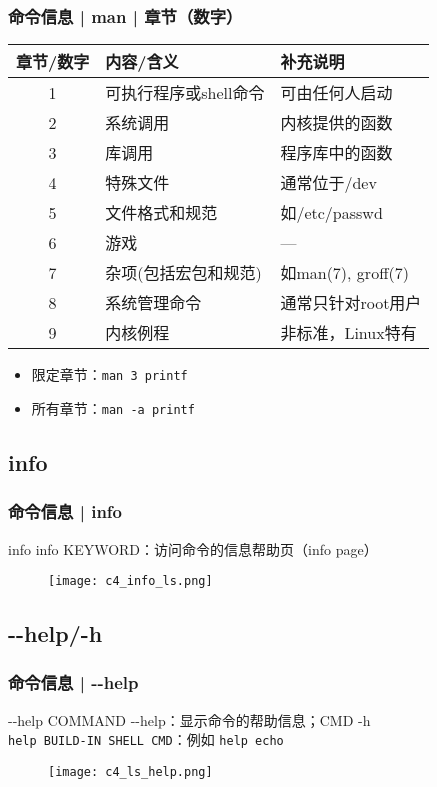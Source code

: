 \begin{frame}[fragile]
  \frametitle{命令信息 | man | 章节（数字）}
  \begin{table}
    \centering
    \begin{tabular}{cll}
      \hline
      \rowcolor{blue!50}章节/数字 & 内容/含义 & 补充说明\\
      \hline
      1 & 可执行程序或shell命令 & 可由任何人启动 \\
      2 & 系统调用 & 内核提供的函数\\
      3 & 库调用 & 程序库中的函数\\
      4 & 特殊文件 & 通常位于/dev\\
      5 & 文件格式和规范 & 如/etc/passwd\\
      6 & 游戏 & ---\\
      7 & 杂项(包括宏包和规范) & 如man(7), groff(7)\\
      8 & 系统管理命令 & 通常只针对root用户\\
      9 & 内核例程 & 非标准，Linux特有\\
      \hline
    \end{tabular}
  \end{table}
  \pause
  \begin{itemize}
    \item 限定章节：\verb|man 3 printf|
    \item 所有章节：\verb|man -a printf|
  \end{itemize}
\end{frame}

\subsection{info}
\begin{frame}
  \frametitle{命令信息 | info}
  \begin{block}{info}
    info KEYWORD：访问命令的信息帮助页（info page）
  \end{block}
  \begin{figure}
    \centering
    \texttt{[image: c4\_info\_ls.png]}
  \end{figure}
\end{frame}

\subsection{-\!-help/-h}
\begin{frame}[fragile]
  \frametitle{命令信息 | -\!-help}
  \begin{block}{-\!-help}
    \alert{COMMAND -\!-help}：显示命令的帮助信息；\alert{CMD -h}\\
    \verb|help BUILD-IN SHELL CMD|：例如 \verb|help echo|
  \end{block}
  \vspace{-0.2cm}
  \begin{figure}
    \centering
    \texttt{[image: c4\_ls\_help.png]}
  \end{figure}
\end{frame}

